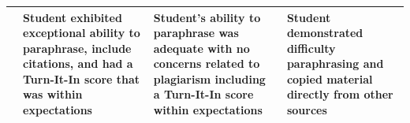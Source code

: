 \documentclass[
  openany]{book}
\begin{document}
\begin{longtable}[]{@{}llll@{}}
\begin{minipage}[t]{0.22\columnwidth}
\end{minipage} & \begin{minipage}[t]{0.22\columnwidth}\raggedright
Student exhibited exceptional ability to paraphrase, include citations, and had a Turn-It-In score that was within expectations\strut
\end{minipage} & \begin{minipage}[t]{0.22\columnwidth}\raggedright
Student's ability to paraphrase was adequate with no concerns related to plagiarism including a Turn-It-In score within expectations\strut
\end{minipage} & \begin{minipage}[t]{0.22\columnwidth}\raggedright
Student demonstrated difficulty paraphrasing and copied material directly from other sources\strut
\end{minipage}\tabularnewline
\bottomrule
\end{longtable}
\end{document}
